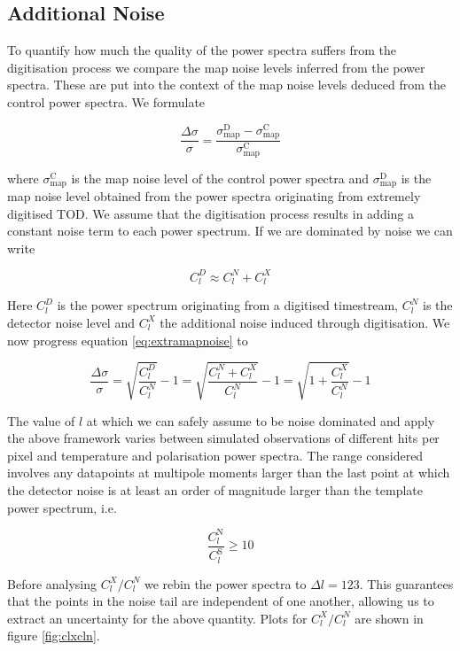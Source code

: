 \documentclass[apj]{emulateapj}
\begin{document}
\subsection{Additional Noise}
\label{subsec:additionalnoise}

To quantify how much the quality of the power spectra suffers from the digitisation process we compare the map noise levels inferred from the power spectra. These are put into the context of the map noise levels deduced from the control power spectra. We formulate

\begin{equation} \label{eq:extramapnoise}
\frac{\Delta \sigma}{\sigma} = \frac{\sigma_{\mathrm{map}}^{\mathrm{D}}-\sigma_{\mathrm{map}}^{\mathrm{C}}}{\sigma_{\mathrm{map}}^{\mathrm{C}}}
\end{equation}

where $\sigma_{\mathrm{map}}^{\mathrm{C}}$ is the map noise level of the control power spectra and $\sigma_{\mathrm{map}}^{\mathrm{D}}$ is the map noise level obtained from the power spectra originating from extremely digitised TOD. We assume that the digitisation process results in adding a constant noise term to each power spectrum. If we are dominated by noise we can write

\[ C_l^D \approx C_l^N + C_l^X \]

Here $C_l^D$ is the power spectrum originating from a digitised timestream, $C_l^N$ is the detector noise level and $C_l^X$ the additional noise induced through digitisation. We now progress equation \ref{eq:extramapnoise} to

\[\frac{\Delta \sigma}{\sigma} = \sqrt{\frac{C_l^D}{C_l^{N}}} - 1  = \sqrt{\frac{C_l^N + C_l^X}{C_l^{N}}} - 1 = \sqrt{1 + \frac{C_l^X}{C_l^{N}}} - 1  \]

The value of $l$ at which we can safely assume to be noise dominated and apply the above framework varies between simulated observations of different hits per pixel and temperature and polarisation power spectra. The range considered involves any datapoints at multipole moments larger than the last point at which the detector noise is at least an order of magnitude larger than the template power spectrum, i.e.

\[ \frac{C_l^{\mathrm{N}}}{C_l^{\mathrm{S}}} \geq 10 \]

Before analysing $C_l^X/C_l^N$ we rebin the power spectra to $\Delta l = 123$. This guarantees that the points in the noise tail are independent of one another, allowing us to extract an uncertainty for the above quantity. Plots for $C_l^X/C_l^N$ are shown in figure \ref{fig:clxcln}.
\end{document}
